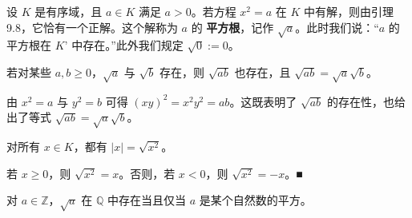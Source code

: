 设 $K$ 是有序域，且 $a \in K$ 满足 $a > 0$。若方程 $x^2 = a$ 在 $K$ 中有解，则由引理 9.8，它恰有一个正解。这个解称为 $a$ 的 \textbf{平方根}，记作 $\sqrt{a}$。此时我们说：“$a$ 的平方根在 $K’$ 中存在。”此外我们规定 $\sqrt{0} := 0$。

\begin{remark}

\begin{items}
\item

若对某些 $ a, b \geq 0 $，$ \sqrt{a} $ 与 $ \sqrt{b} $ 存在，则 $ \sqrt{ab} $ 也存在，且 $ \sqrt{ab} = \sqrt{a}\sqrt{b} $。

\proofhead
由 $x^2 = a$ 与 $y^2 = b$ 可得 $(xy)^2 = x^2y^2 = ab$。这既表明了 $\sqrt{ab}$ 的存在性，也给出了等式 $\sqrt{ab} = \sqrt{a}\sqrt{b}$。
\item

对所有 $ x \in K $，都有 $ |x| = \sqrt{x^2} $。

\proofhead
若 $ x \geq 0 $，则 $ \sqrt{x^2} = x $。否则，若 $ x < 0 $，则 $ \sqrt{x^2} = -x $。■
\item

对 $ a \in \mathbb{Z} $，$ \sqrt{a} $ 在 $ \mathbb{Q} $ 中存在当且仅当 $ a $ 是某个自然数的平方。

\end{items}

\end{remark}

\exerciseshead

